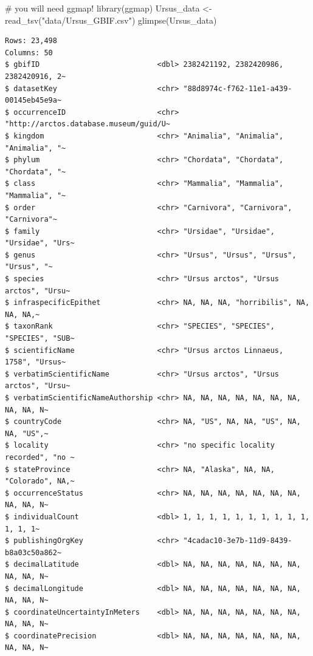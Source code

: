 \documentclass[
  letterpaper,
  DIV=11,
  numbers=noendperiod]{scrreprt}
\newenvironment{Shaded}{\begin{snugshade}}{\end{snugshade}}
\newcommand{\CommentTok}[1]{\textcolor[rgb]{0.37,0.37,0.37}{#1}}
\newcommand{\FunctionTok}[1]{\textcolor[rgb]{0.28,0.35,0.67}{#1}}
\newcommand{\NormalTok}[1]{\textcolor[rgb]{0.00,0.23,0.31}{#1}}
\newcommand{\OtherTok}[1]{\textcolor[rgb]{0.00,0.23,0.31}{#1}}
\newcommand{\StringTok}[1]{\textcolor[rgb]{0.13,0.47,0.30}{#1}}
\begin{document}
\begin{Shaded}
\begin{Highlighting}[]
\CommentTok{\# you will need ggmap!}
\FunctionTok{library}\NormalTok{(ggmap)}
\NormalTok{Ursus\_data }\OtherTok{\textless{}{-}} \FunctionTok{read\_tsv}\NormalTok{(}\StringTok{"data/Ursus\_GBIF.csv"}\NormalTok{)}
\FunctionTok{glimpse}\NormalTok{(Ursus\_data)}
\end{Highlighting}
\end{Shaded}

\begin{verbatim}
Rows: 23,498
Columns: 50
$ gbifID                           <dbl> 2382421192, 2382420986, 2382420916, 2~
$ datasetKey                       <chr> "88d8974c-f762-11e1-a439-00145eb45e9a~
$ occurrenceID                     <chr> "http://arctos.database.museum/guid/U~
$ kingdom                          <chr> "Animalia", "Animalia", "Animalia", "~
$ phylum                           <chr> "Chordata", "Chordata", "Chordata", "~
$ class                            <chr> "Mammalia", "Mammalia", "Mammalia", "~
$ order                            <chr> "Carnivora", "Carnivora", "Carnivora"~
$ family                           <chr> "Ursidae", "Ursidae", "Ursidae", "Urs~
$ genus                            <chr> "Ursus", "Ursus", "Ursus", "Ursus", "~
$ species                          <chr> "Ursus arctos", "Ursus arctos", "Ursu~
$ infraspecificEpithet             <chr> NA, NA, NA, "horribilis", NA, NA, NA,~
$ taxonRank                        <chr> "SPECIES", "SPECIES", "SPECIES", "SUB~
$ scientificName                   <chr> "Ursus arctos Linnaeus, 1758", "Ursus~
$ verbatimScientificName           <chr> "Ursus arctos", "Ursus arctos", "Ursu~
$ verbatimScientificNameAuthorship <chr> NA, NA, NA, NA, NA, NA, NA, NA, NA, N~
$ countryCode                      <chr> NA, "US", NA, NA, "US", NA, NA, "US",~
$ locality                         <chr> "no specific locality recorded", "no ~
$ stateProvince                    <chr> NA, "Alaska", NA, NA, "Colorado", NA,~
$ occurrenceStatus                 <chr> NA, NA, NA, NA, NA, NA, NA, NA, NA, N~
$ individualCount                  <dbl> 1, 1, 1, 1, 1, 1, 1, 1, 1, 1, 1, 1, 1~
$ publishingOrgKey                 <chr> "4cadac10-3e7b-11d9-8439-b8a03c50a862~
$ decimalLatitude                  <dbl> NA, NA, NA, NA, NA, NA, NA, NA, NA, N~
$ decimalLongitude                 <dbl> NA, NA, NA, NA, NA, NA, NA, NA, NA, N~
$ coordinateUncertaintyInMeters    <dbl> NA, NA, NA, NA, NA, NA, NA, NA, NA, N~
$ coordinatePrecision              <dbl> NA, NA, NA, NA, NA, NA, NA, NA, NA, N~

\end{verbatim}
\end{document}
